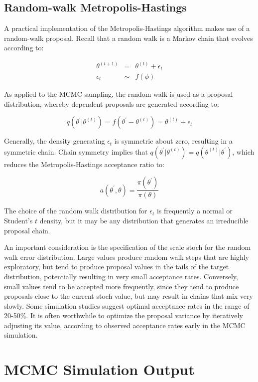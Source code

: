 \documentclass[]{book}
\begin{document}
\subsection{Random-walk Metropolis-Hastings}

A practical implementation of the Metropolis-Hastings algorithm makes use of a random-walk proposal. Recall that a random walk is a Markov chain that evolves according to:

\begin{eqnarray*}
\theta^{(t+1)} &=& \theta^{(t)} + \epsilon_t \\
\epsilon_t &\sim& f(\phi)
\end{eqnarray*}

As applied to the MCMC sampling, the random walk is used as a proposal distribution, whereby dependent proposals are generated according to:

\[
q(\theta^{\prime} | \theta^{(t)}) = f(\theta^{\prime} - \theta^{(t)}) = \theta^{(t)} + \epsilon_t
\]

Generally, the density generating $\epsilon_t$ is symmetric about zero, resulting in a symmetric chain. Chain symmetry implies that $q(\theta^{\prime} | \theta^{(t)}) = q(\theta^{(t)} | \theta^{\prime})$, which reduces the Metropolis-Hastings acceptance ratio to:

\[
a(\theta^{\prime},\theta) = \frac{\pi(\theta^{\prime})}{\pi(\theta)}
\]

The choice of the random walk distribution for $\epsilon_t$ is frequently a normal or Student's $t$ density, but it may be any distribution that generates an irreducible proposal chain.

An important consideration is the specification of the scale stoch for the random walk error distribution. Large values produce random walk steps that are highly exploratory, but tend to produce proposal values in the tails of the target distribution, potentially resulting in very small acceptance rates. Conversely, small values tend to be accepted more frequently, since they tend to produce proposals close to the current stoch value, but may result in chains that mix very slowly. Some simulation studies suggest optimal acceptance rates in the range of 20-50\%. It is often worthwhile to optimize the proposal variance by iteratively adjusting its value, according to observed acceptance rates early in the MCMC simulation.

\section{MCMC Simulation Output}
\end{document}
